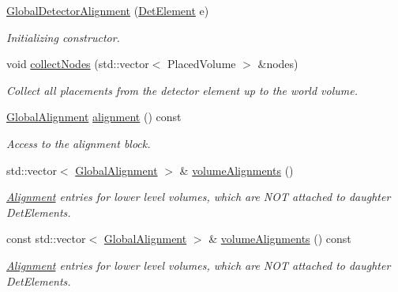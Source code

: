 \begin{DoxyCompactItemize}
\item 
\hyperlink{class_d_d4hep_1_1_alignments_1_1_global_detector_alignment_a82f59bb92f37d35c0d9dbe2b342a25ca}{GlobalDetectorAlignment} (\hyperlink{namespace_d_d4hep_a21dd977310ff183f61ca6ae14b59a989}{DetElement} e)
\begin{DoxyCompactList}\small\item\em Initializing constructor. \item\end{DoxyCompactList}\item 
void \hyperlink{class_d_d4hep_1_1_alignments_1_1_global_detector_alignment_a05789b13a179780a57c759a573fdfe85}{collectNodes} (std::vector$<$ PlacedVolume $>$ \&nodes)
\begin{DoxyCompactList}\small\item\em Collect all placements from the detector element up to the world volume. \item\end{DoxyCompactList}\item 
\hyperlink{class_d_d4hep_1_1_alignments_1_1_global_alignment}{GlobalAlignment} \hyperlink{class_d_d4hep_1_1_alignments_1_1_global_detector_alignment_a4c86dcdecf0985adee4f709f0db5a9e9}{alignment} () const 
\begin{DoxyCompactList}\small\item\em Access to the alignment block. \item\end{DoxyCompactList}\item 
std::vector$<$ \hyperlink{class_d_d4hep_1_1_alignments_1_1_global_alignment}{GlobalAlignment} $>$ \& \hyperlink{class_d_d4hep_1_1_alignments_1_1_global_detector_alignment_aac0cf5fe586639599e736913cadf00c2}{volumeAlignments} ()
\begin{DoxyCompactList}\small\item\em \hyperlink{class_d_d4hep_1_1_alignments_1_1_alignment}{Alignment} entries for lower level volumes, which are NOT attached to daughter DetElements. \item\end{DoxyCompactList}\item 
const std::vector$<$ \hyperlink{class_d_d4hep_1_1_alignments_1_1_global_alignment}{GlobalAlignment} $>$ \& \hyperlink{class_d_d4hep_1_1_alignments_1_1_global_detector_alignment_a9795692b0b80e01f6cc3e35d0c953771}{volumeAlignments} () const 
\begin{DoxyCompactList}\small\item\em \hyperlink{class_d_d4hep_1_1_alignments_1_1_alignment}{Alignment} entries for lower level volumes, which are NOT attached to daughter DetElements. \item\end{DoxyCompactList}\item 

\end{DoxyCompactItemize}
